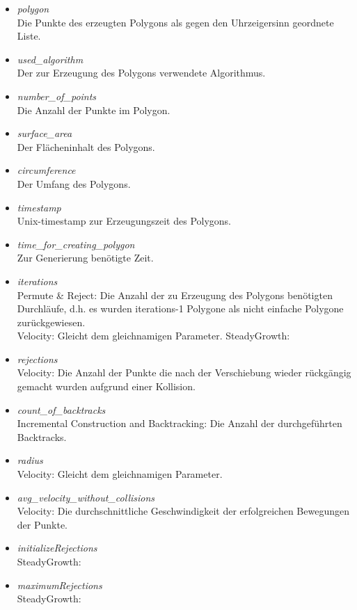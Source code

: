     \begin{itemize}
      \item \emph{polygon}\\
        Die Punkte des erzeugten Polygons als gegen den Uhrzeigersinn geordnete 
        Liste.
      \item \emph{used\_algorithm}\\
        Der zur Erzeugung des Polygons verwendete Algorithmus.
      \item \emph{number\_of\_points}\\
        Die Anzahl der Punkte im Polygon.
      \item \emph{surface\_area}\\
        Der Flächeninhalt des Polygons.
      \item \emph{circumference}\\
        Der Umfang des Polygons.
      \item \emph{timestamp}\\
        Unix-timestamp zur Erzeugungszeit des Polygons.
      \item \emph{time\_for\_creating\_polygon}\\
        Zur Generierung benötigte Zeit.
      \item \emph{iterations}\\
        Permute \& Reject: Die Anzahl der zu Erzeugung des Polygons benötigten 
        Durchläufe, d.h. es wurden iterations-1 Polygone als nicht einfache 
        Polygone zurückgewiesen.\\
        Velocity: Gleicht dem gleichnamigen Parameter.
        SteadyGrowth: %
      \item \emph{rejections}\\
        Velocity: Die Anzahl der Punkte die nach der Verschiebung wieder rückgängig gemacht wurden aufgrund einer Kollision.
      \item \emph{count\_of\_backtracks}\\
        Incremental Construction and Backtracking: Die Anzahl der 
        durchgeführten Backtracks.
      \item \emph{radius}\\
        Velocity: Gleicht dem gleichnamigen Parameter.
      \item \emph{avg\_velocity\_without\_collisions}\\
        Velocity: Die durchschnittliche Geschwindigkeit der erfolgreichen Bewegungen der Punkte.
      \item \emph{initializeRejections}\\
        SteadyGrowth: %
      \item \emph{maximumRejections}\\
        SteadyGrowth: %
    \end{itemize}

